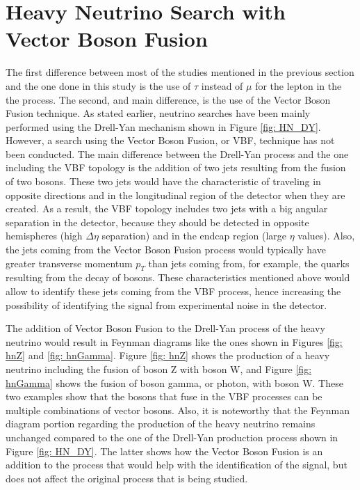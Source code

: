 \section{Heavy Neutrino Search with Vector Boson Fusion}

The first difference between most of the studies mentioned in the previous section and the one done in this study is the use of $\tau$ instead of $\mu$ for the lepton in the the process. The second, and main difference, is the use of the Vector Boson Fusion technique. As stated earlier, neutrino searches have been mainly performed using the Drell-Yan mechanism shown in Figure \ref{fig: HN_DY}. However, a search using the Vector Boson Fusion, or VBF, technique has not been conducted. The main difference between the Drell-Yan process and the one including the VBF topology is the addition of two jets resulting from the fusion of two bosons. These two jets would have the characteristic of traveling in opposite directions and in the longitudinal region of the detector when they are created. As a result, the VBF topology includes two jets with a big angular separation in the detector, because they should be detected in opposite hemispheres (high $\Delta \eta$ separation) and in the endcap region (large $\eta$ values). Also, the jets coming from the Vector Boson Fusion process would typically have greater transverse momentum $p_{T}$ than jets coming from, for example, the quarks resulting from the decay of bosons. These characteristics mentioned above would allow to identify these jets coming from the VBF process, hence increasing the possibility of identifying the signal from experimental noise in the detector.

The addition of Vector Boson Fusion to the Drell-Yan process of the heavy neutrino would result in Feynman diagrams like the ones shown in Figures \ref{fig: hnZ} and \ref{fig: hnGamma}. Figure \ref{fig: hnZ} shows the production of a heavy neutrino including the fusion of boson Z with boson W, and Figure \ref{fig: hnGamma} shows the fusion of boson gamma, or photon, with boson W. These two examples show that the bosons that fuse in the VBF processes can be multiple combinations of vector bosons. Also, it is noteworthy that the Feynman diagram portion regarding the production of the heavy neutrino remains unchanged compared to the one of the Drell-Yan production process shown in Figure \ref{fig: HN_DY}. The latter shows how the Vector Boson Fusion is an addition to the process that would help with the identification of the signal, but does not affect the original process that is being studied. 

